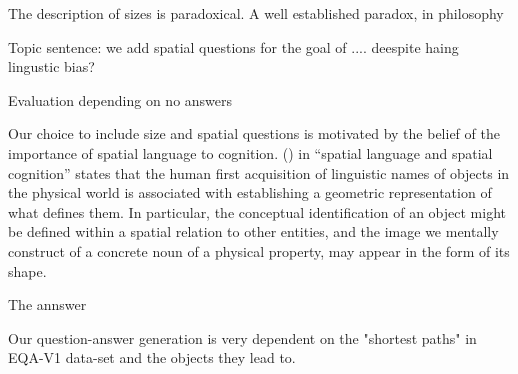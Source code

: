 The description of sizes is paradoxical. A well established paradox, in philosophy


Topic sentence: we add spatial questions for the goal of .... deespite haing lingustic bias? 

Evaluation depending on no answers


Our choice to include size and spatial questions is motivated by the belief of the importance of spatial language to cognition. (\cite{landau1993whence}) in “spatial language and spatial cognition” states that the human first acquisition of linguistic names of objects in the physical world is associated with establishing a geometric representation of what defines them. In particular, the conceptual identification of an object might be defined within a spatial relation to other entities, and the image we mentally construct of a concrete noun of a physical property, may appear in the form of its shape.

The annswer 

Our question-answer generation is very dependent on the "shortest paths" in EQA-V1 data-set and the objects they lead to.  




